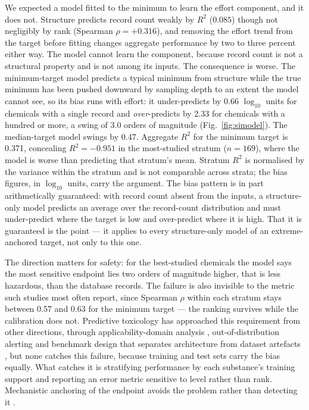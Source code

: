 \documentclass[preprint,11pt]{elsarticle}
\begin{document}
We expected a model fitted to the minimum to learn the effort component, and it
does not. Structure predicts record count weakly by $R^2$ ($0.085$) though not
negligibly by rank (Spearman $\rho = +0.316$), and
removing the effort trend from the target before fitting changes aggregate
performance by two to three percent either way. The model cannot learn the
component, because record count is not a structural property and is not among
its inputs. The consequence is worse. The minimum-target model predicts a
typical minimum from structure while the true minimum has been pushed downward
by sampling depth to an extent the model cannot see, so its bias runs with
effort: it under-predicts by 0.66 $\log_{10}$ units for chemicals with a single
record and \emph{over}-predicts by 2.33 for chemicals with a hundred or more, a
swing of 3.0 orders of magnitude (Fig.~\ref{fig:simodel}). The median-target model
swings by 0.47. Aggregate $R^2$ for the minimum target is 0.371, concealing $R^2 = -0.951$ in
the most-studied stratum ($n = 169$), where the model is worse than predicting
that stratum's mean. Stratum $R^2$ is normalised by the variance within the
stratum and is not comparable across strata; the bias figures, in $\log_{10}$
units, carry the argument. The bias pattern is in part arithmetically
guaranteed: with record count absent from the inputs, a structure-only model
predicts an average over the record-count distribution and must under-predict
where the target is low and over-predict where it is high. That it is
guaranteed is the point --- it applies to every structure-only model of an
extreme-anchored target, not only to this one.

The direction matters for safety: for the best-studied chemicals the model says
the most sensitive endpoint lies two orders of magnitude higher, that is less
hazardous, than the database records. The failure is also invisible to the
metric such studies most often report, since Spearman $\rho$ within each stratum
stays between 0.57 and 0.63 for the minimum target --- the ranking survives
while the calibration does not. Predictive toxicology has approached this
requirement from other directions, through applicability-domain analysis
\cite{sahigara2012ad}, out-of-distribution alerting \cite{kang2026openset} and
benchmark design that separates architecture from dataset artefacts
\cite{kim2026driftrobust}, but none catches this failure, because training and
test sets carry the bias equally. What catches it is stratifying performance by
each substance's training support and reporting an error metric sensitive to
level rather than rank. Mechanistic anchoring of the endpoint avoids the problem
rather than detecting it \cite{jang2025opqsar}.
\end{document}
